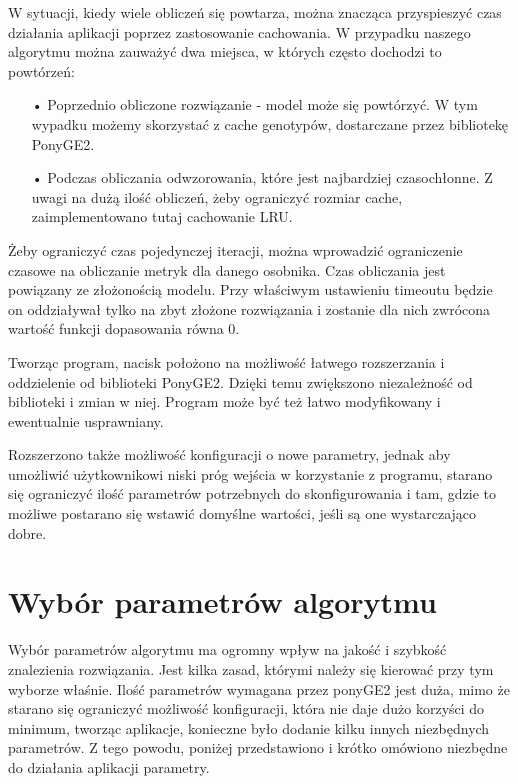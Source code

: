 W sytuacji, kiedy wiele obliczeń się powtarza, można znacząca przyspieszyć czas działania aplikacji poprzez zastosowanie cachowania. W przypadku naszego algorytmu można zauważyć dwa miejsca, w których często dochodzi to powtórzeń:
\begin{itemize}
  \item[•] Poprzednio obliczone rozwiązanie - model może się powtórzyć. W tym wypadku możemy skorzystać z cache genotypów, dostarczane przez bibliotekę PonyGE2.
  \item[•] Podczas obliczania odwzorowania, które jest najbardziej czasochłonne. Z uwagi na dużą ilość obliczeń, żeby ograniczyć rozmiar cache, zaimplementowano tutaj cachowanie LRU.
\end{itemize}

Żeby ograniczyć czas pojedynczej iteracji, można wprowadzić ograniczenie czasowe na obliczanie metryk dla danego osobnika. Czas obliczania jest powiązany ze złożonością modelu. Przy właściwym ustawieniu timeoutu będzie on oddziaływał tylko na zbyt złożone rozwiązania i zostanie dla nich zwrócona wartość funkcji dopasowania równa 0.

Tworząc program, nacisk położono na możliwość łatwego rozszerzania i oddzielenie od biblioteki PonyGE2. Dzięki temu zwiększono niezależność od biblioteki i zmian w niej. Program może być też łatwo modyfikowany i ewentualnie usprawniany. 

Rozszerzono także możliwość konfiguracji o nowe parametry, jednak aby umożliwić użytkownikowi niski próg wejścia w korzystanie z programu, starano się ograniczyć ilość parametrów potrzebnych do skonfigurowania i tam, gdzie to możliwe postarano się wstawić domyślne wartości, jeśli są one wystarczająco dobre. 

\section{Wybór parametrów algorytmu}
Wybór parametrów algorytmu ma ogromny wpływ na jakość i szybkość znalezienia rozwiązania. Jest kilka zasad, którymi należy się kierować przy tym wyborze właśnie. Ilość parametrów wymagana przez ponyGE2 jest duża, mimo że starano się ograniczyć możliwość konfiguracji, która nie daje dużo korzyści do minimum, tworząc aplikacje, konieczne było dodanie kilku innych niezbędnych parametrów. Z tego powodu, poniżej przedstawiono i krótko omówiono niezbędne do działania aplikacji parametry.

